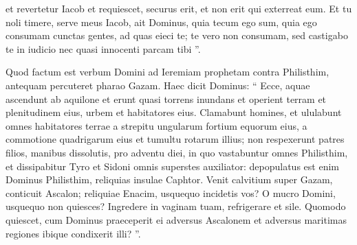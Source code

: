 \begin{biblechapter}
\begin{biblechapter}
\begin{biblechapter}
\begin{biblechapter}
\begin{biblechapter}
\begin{biblechapter}
\begin{biblechapter}
\begin{biblechapter}
\begin{biblechapter}
\begin{biblechapter}
\begin{biblechapter}
\begin{biblechapter}
\begin{biblechapter}
\begin{biblechapter}
\begin{biblechapter}
\begin{biblechapter}
\begin{biblechapter}
\begin{biblechapter}
\begin{biblechapter}
\begin{biblechapter}
\begin{biblechapter}
\begin{biblechapter}
\begin{biblechapter}
\begin{biblechapter}
\begin{biblechapter}
\begin{biblechapter}
\begin{biblechapter}
\begin{biblechapter}
\begin{biblechapter}
\begin{biblechapter}
\begin{biblechapter}
\begin{biblechapter}
\begin{biblechapter}
\begin{biblechapter}
\begin{biblechapter}
\begin{biblechapter}
\begin{biblechapter}
\begin{biblechapter}
\begin{biblechapter}
\begin{biblechapter}
\begin{biblechapter}
\begin{biblechapter}
\begin{biblechapter}
\begin{biblechapter}
\begin{biblechapter}
\begin{biblechapter}
 et revertetur Iacob et requiescet,
 securus erit, et non erit qui exterreat eum.
 \verse Et tu noli timere, serve meus Iacob,
 ait Dominus,
 quia tecum ego sum,
 quia ego consumam cunctas gentes, ad quas eieci te;
 te vero non consumam,
 sed castigabo te in iudicio
 nec quasi innocenti parcam tibi ”.
 
\begin{biblechapter}
\verse Quod factum est verbum Domini ad Ieremiam prophetam contra Philisthim, antequam percuteret pharao Gazam.
 \verse Haec dicit Dominus:
 “ Ecce, aquae ascendunt ab aquilone
 et erunt quasi torrens inundans
 et operient terram et plenitudinem eius,
 urbem et habitatores eius.
 Clamabunt homines,
 et ululabunt omnes habitatores terrae
 \verse a strepitu ungularum fortium equorum eius,
 a commotione quadrigarum eius
 et tumultu rotarum illius;
 non respexerunt patres filios, manibus dissolutis,
 \verse pro adventu diei, in quo vastabuntur omnes Philisthim,
 et dissipabitur Tyro et Sidoni omnis superstes auxiliator:
 depopulatus est enim Dominus Philisthim,
 reliquias insulae Caphtor.
 \verse Venit calvitium super Gazam,
 conticuit Ascalon;
 reliquiae Enacim,
 usquequo incidetis vos?
 \verse O mucro Domini,
 usquequo non quiesces?
 Ingredere in vaginam tuam,
 refrigerare et sile.
 \verse Quomodo quiescet,
 cum Dominus praeceperit ei adversus Ascalonem
 et adversus maritimas regiones
 ibique condixerit illi? ”.
 

\end{biblechapter}
\end{biblechapter}
\end{biblechapter}
\end{biblechapter}
\end{biblechapter}
\end{biblechapter}
\end{biblechapter}
\end{biblechapter}
\end{biblechapter}
\end{biblechapter}
\end{biblechapter}
\end{biblechapter}
\end{biblechapter}
\end{biblechapter}
\end{biblechapter}
\end{biblechapter}
\end{biblechapter}
\end{biblechapter}
\end{biblechapter}
\end{biblechapter}
\end{biblechapter}
\end{biblechapter}
\end{biblechapter}
\end{biblechapter}
\end{biblechapter}
\end{biblechapter}
\end{biblechapter}
\end{biblechapter}
\end{biblechapter}
\end{biblechapter}
\end{biblechapter}
\end{biblechapter}
\end{biblechapter}
\end{biblechapter}
\end{biblechapter}
\end{biblechapter}
\end{biblechapter}
\end{biblechapter}
\end{biblechapter}
\end{biblechapter}
\end{biblechapter}
\end{biblechapter}
\end{biblechapter}
\end{biblechapter}
\end{biblechapter}
\end{biblechapter}
\end{biblechapter}
